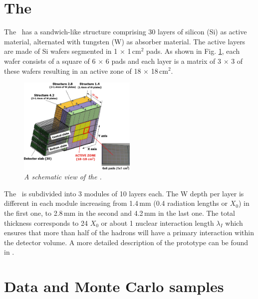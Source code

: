 \section{The \ecalp}
\label{sec:ecal}
The \ecalp\ has a sandwich-like structure comprising 30 layers of silicon (Si) as active material, alternated with tungsten (W) as absorber material. The active layers are made of Si wafers segmented in 1 $\times$ 1\,cm$^2$ pads. As shown in Fig. \ref{fig:ECAL-scheme}, each wafer consists of a square of 6 $\times$ 6 pads and each layer is a matrix of 3 $\times$ 3 of these wafers resulting in an active zone of 18 $\times$ 18\,cm$^2$.
\begin{figure}[H]
	\centering
	\includegraphics[width=0.5\textwidth]{ECAL/graphics/ecal-new.png}
	\caption{\label{fig:ECAL-scheme} \sl A schematic view of the \ecalp.}
\end{figure}
The \ecal\ is subdivided into 3 modules of 10 layers each. The W depth per layer is different in each module increasing from 1.4\,mm (0.4 radiation lengths or $X_0$) in the first one, to 2.8\,mm in the second and 4.2\,mm in the last one. The total thickness corresponds to 24 $X_0$ or about 1 nuclear interaction length $\lambda_I$ which ensures that more than half of the hadrons will have a primary interaction within the detector volume.
A more detailed description of the prototype can be found in \cite{Anduze:2008hq}.


\section{Data and Monte Carlo samples}
\label{sec:data}
